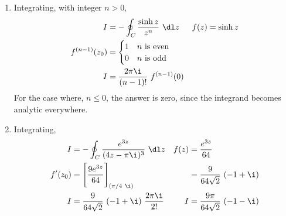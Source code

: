 \begin{enumerate}
    \item Integrating, with integer $ n > 0 $,
          \begin{align}
              I              & = -\oint_C \frac{\sinh z}{z^n}\ \dl z &
              f(z)           & = \sinh z                               \\
              f^{(n-1)}(z_0) & = \begin{cases}
                                     1 & n\ \text{is even} \\
                                     0 & n\ \text{is odd}  \\
                                 \end{cases}                 \\
              I              & = \frac{2\pi\i}{(n-1)!}\ f^{(n-1)}(0)
          \end{align}
          For the case where, $ n \leq 0 $, the answer is zero, since the integrand
          becomes analytic everywhere.

    \item Integrating,
          \begin{align}
              I       & = -\oint_C \frac{e^{3z}}{(4z - \pi\i)^3}\ \dl z      &
              f(z)    & = \frac{e^{3z}}{64}                                    \\
              f'(z_0) & = \Bigg[ \frac{9e^{3z}}{64} \Bigg]_{(\pi/4\ \i)}     &
                      & = \frac{9}{64\sqrt{2}}\ (-1 + \i)                      \\
              I       & = \frac{9}{64\sqrt{2}}\ (-1 + \i)\ \frac{2\pi\i}{2!} &
              I       & = \frac{9\pi}{64\sqrt{2}}\ (-1-\i)
          \end{align}


\end{enumerate}

